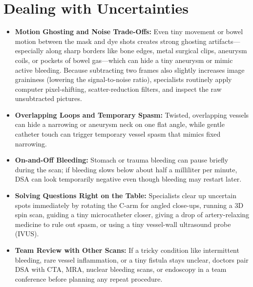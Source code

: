 \section{Dealing with Uncertainties}
\begin{itemize}
\item \textbf{Motion Ghosting and Noise Trade-Offs:} Even tiny movement or bowel motion between the mask and dye shots creates strong ghosting artifacts---especially along sharp borders like bone edges, metal surgical clips, aneurysm coils, or pockets of bowel gas---which can hide a tiny aneurysm or mimic active bleeding. Because subtracting two frames also slightly increases image graininess (lowering the signal-to-noise ratio), specialists routinely apply computer pixel-shifting, scatter-reduction filters, and inspect the raw unsubtracted pictures.
\item \textbf{Overlapping Loops and Temporary Spasm:} Twisted, overlapping vessels can hide a narrowing or aneurysm neck on one flat angle, while gentle catheter touch can trigger temporary vessel spasm that mimics fixed narrowing.
\item \textbf{On-and-Off Bleeding:} Stomach or trauma bleeding can pause briefly during the scan; if bleeding slows below about half a milliliter per minute, DSA can look temporarily negative even though bleeding may restart later.
\item \textbf{Solving Questions Right on the Table:} Specialists clear up uncertain spots immediately by rotating the C-arm for angled close-ups, running a 3D spin scan, guiding a tiny microcatheter closer, giving a drop of artery-relaxing medicine to rule out spasm, or using a tiny vessel-wall ultrasound probe (IVUS).
\item \textbf{Team Review with Other Scans:} If a tricky condition like intermittent bleeding, rare vessel inflammation, or a tiny fistula stays unclear, doctors pair DSA with CTA, MRA, nuclear bleeding scans, or endoscopy in a team conference before planning any repeat procedure.
\end{itemize}

